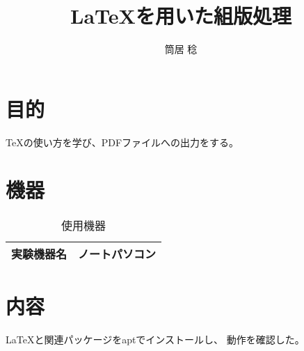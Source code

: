 \documentclass{jsarticle}
\begin{document}


\title{LaTeXを用いた組版処理}
\author{筒居 稔}
\maketitle


\section{目的}
TeXの使い方を学び、PDFファイルへの出力をする。

\section{機器}
\begin{table}[hbtp]
 \caption{使用機器}
 \label{siyou}
 \centering
  \begin{tabular}{|c|c|}\hline
			実験機器名&ノートパソコン\\ \hline
  \end{tabular}
\end{table}

\section{内容}
LaTeXと関連パッケージをaptでインストールし、
動作を確認した。

\end{document}
